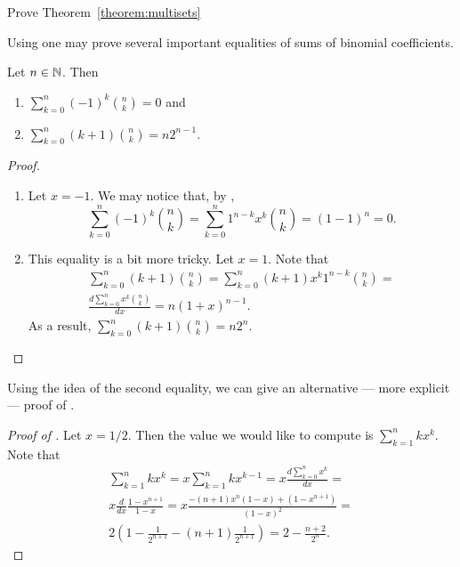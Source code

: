 \begin{exercise}
  Prove Theorem~\ref{theorem:multisets}
\end{exercise}

Using  one may prove several important equalities of sums
of binomial coefficients.
\begin{corollary}
  Let $n \in {\mathbb{N}}$. Then
  \begin{enumerate}
    \item $\sum_{k = 0}^n (-1)^k \binom{n}{k} = 0$ and
    \item $\sum_{k = 0}^n (k + 1) \binom{n}{k} = n 2^{n - 1}$.
  \end{enumerate}
\end{corollary}
\begin{proof}
  \begin{enumerate}
    \item Let $x = -1$. We may notice that, by , 
      \[
        \sum_{k = 0}^n (-1)^k \binom{n}{k} = 
        \sum_{k = 0}^n 1^{n - k} x^k \binom{n}{k} = (1 - 1)^n = 0.
      \]
    \item This equality is a bit more tricky. Let $x = 1$. Note that
      \begin{multline*}
        \sum_{k = 0}^n (k + 1) \binom{n}{k} = 
        \sum_{k = 0}^n (k + 1) x^k 1^{n - k} \binom{n}{k} = \\
        \frac{d \sum_{k = 0}^n x^k \binom{n}{k}}{dx} = n (1 + x)^{n - 1}.
      \end{multline*}
      As a result, $\sum_{k = 0}^n (k + 1) \binom{n}{k} = n 2^n$.
  \end{enumerate}
\end{proof}


Using the idea of the second equality, we can give an alternative --- more
explicit --- proof of .
\begin{proof}[Proof of ]
\label{proof-claim:guess-one-out-of-many}
  Let $x = 1 / 2$. Then the value we would like to compute is 
  $\sum_{k = 1}^n k x^k$. Note that
  \begin{multline*}
    \sum_{k = 1}^n k x^k = x \sum_{k = 1}^n k x^{k - 1} =
    x \frac{d \sum_{k = 0}^n x^k}{dx} = \\
    x \frac{d}{dx} \frac{1 - x^{n + 1}}{1 - x} = 
    x \frac{-(n + 1) x^n (1 - x) + (1 - x^{n + 1})}{(1 - x)^2} =  \\
    2\left(
      1 - \frac{1}{2^{n + 1}} - (n + 1) \frac{1}{2^{n + 1}}
    \right) = 2 - \frac{n + 2}{2^n}.
  \end{multline*}
\end{proof}

